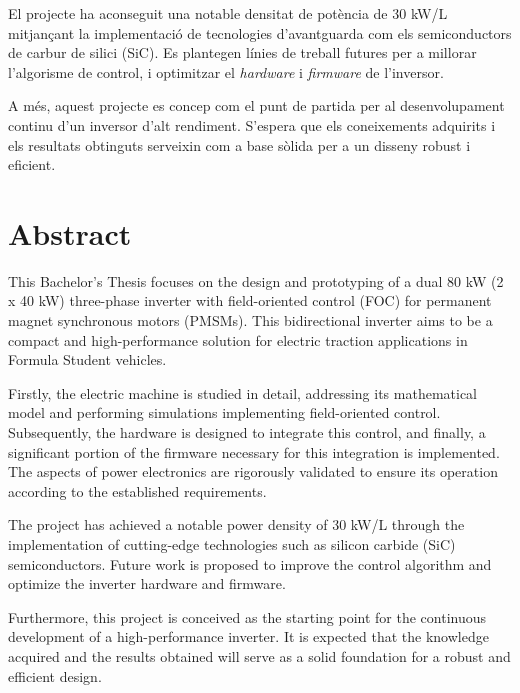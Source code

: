 El projecte ha aconseguit una notable densitat de potència de 30 kW/L mitjançant la implementació de tecnologies d'avantguarda com els semiconductors de carbur de silici (SiC). Es plantegen línies de treball futures per a millorar l'algorisme de control, i optimitzar el \textit{hardware} i \textit{firmware} de l'inversor.

A més, aquest projecte es concep com el punt de partida per al desenvolupament continu d'un inversor d'alt rendiment. S'espera que els coneixements adquirits i els resultats obtinguts serveixin com a base sòlida per a un disseny robust i eficient.


\chapter*{Abstract}
This Bachelor's Thesis focuses on the design and prototyping of a dual 80 kW (2 x 40 kW) three-phase inverter with field-oriented control (FOC) for permanent magnet synchronous motors (PMSMs). This bidirectional inverter aims to be a compact and high-performance solution for electric traction applications in Formula Student vehicles.

Firstly, the electric machine is studied in detail, addressing its mathematical model and performing simulations implementing field-oriented control. Subsequently, the hardware is designed to integrate this control, and finally, a significant portion of the firmware necessary for this integration is implemented. The aspects of power electronics are rigorously validated to ensure its operation according to the established requirements.

The project has achieved a notable power density of 30 kW/L through the implementation of cutting-edge technologies such as silicon carbide (SiC) semiconductors. Future work is proposed to improve the control algorithm and optimize the inverter hardware and firmware.

Furthermore, this project is conceived as the starting point for the continuous development of a high-performance inverter. It is expected that the knowledge acquired and the results obtained will serve as a solid foundation for a robust and efficient design.